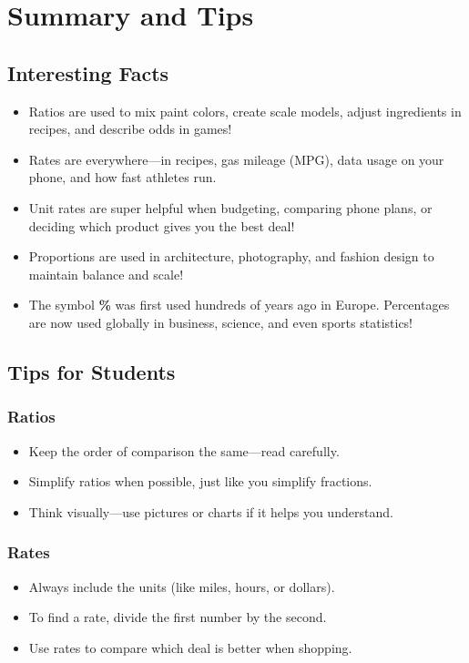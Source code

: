 \cleardoublepage
\section{Summary and Tips}

\subsection*{Interesting Facts}

\begin{itemize}
  \item Ratios are used to mix paint colors, create scale models, adjust ingredients in recipes, and describe odds in games!
  \item Rates are everywhere—in recipes, gas mileage (MPG), data usage on your phone, and how fast athletes run.
  \item Unit rates are super helpful when budgeting, comparing phone plans, or deciding which product gives you the best deal!
  \item Proportions are used in architecture, photography, and fashion design to maintain balance and scale!
  \item The symbol \textbf{\%} was first used hundreds of years ago in Europe. Percentages are now used globally in business, science, and even sports statistics!
\end{itemize}

\subsection*{Tips for Students}

\subsubsection*{Ratios}
\begin{itemize}
  \item Keep the order of comparison the same—read carefully.
  \item Simplify ratios when possible, just like you simplify fractions.
  \item Think visually—use pictures or charts if it helps you understand.
\end{itemize}

\subsubsection*{Rates}
\begin{itemize}
  \item Always include the units (like miles, hours, or dollars).
  \item To find a rate, divide the first number by the second.
  \item Use rates to compare which deal is better when shopping.
\end{itemize}

